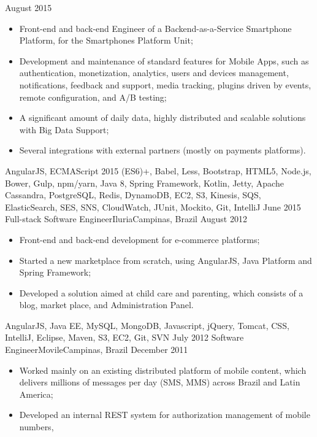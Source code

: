 \begin{experiences}
    {August 2015} {
    \begin{itemize}
      \item Front-end and back-end Engineer of a Backend-as-a-Service Smartphone Platform,
      for the Smartphones Platform Unit;
      \item Development and maintenance of standard features for Mobile Apps, such as authentication,
      monetization, analytics, users and devices management, notifications, feedback and support,
      media tracking, plugins driven by events, remote configuration, and A/B testing;
      \item A significant amount of daily data, highly distributed and scalable solutions with Big Data Support;
      \item Several integrations with external partners (mostly on payments platforms).\\
    \end{itemize}
  }
  {AngularJS, ECMAScript 2015 (ES6)+, Babel, Less, Bootstrap, HTML5, Node.js, Bower, Gulp, npm/yarn, Java 8, Spring Framework, Kotlin, Jetty, Apache Cassandra, PostgreSQL, Redis, DynamoDB, EC2, S3, Kinesis, SQS, ElasticSearch, SES, SNS, CloudWatch, JUnit, Mockito, Git, IntelliJ}
  \emptySeparator
  \experience
    {June 2015} {Full-stack Software Engineer}{Iluria}{Campinas, Brazil}
    {August 2012}    {
      \begin{itemize}
        \item Front-end and back-end development for e-commerce platforms;
        \item Started a new marketplace from scratch, using AngularJS, Java Platform and Spring Framework;
        \item Developed a solution aimed at child care and parenting, which consists of a blog, market place, and Administration Panel.\\
      \end{itemize}
    }{AngularJS, Java EE, MySQL, MongoDB, Javascript, jQuery, Tomcat, CSS, IntelliJ, Eclipse, Maven, S3, EC2, Git, SVN}
  \emptySeparator
  \experience
    {July 2012} {Software Engineer}{Movile}{Campinas, Brazil}
    {December 2011}    {
          \begin{itemize}
            \item Worked mainly on an existing distributed platform of mobile content, which delivers millions of
            messages per day (SMS, MMS) across Brazil and Latin America;
            \item Developed an internal REST system for authorization management of mobile numbers,

\end{itemize}}
\end{experiences}
